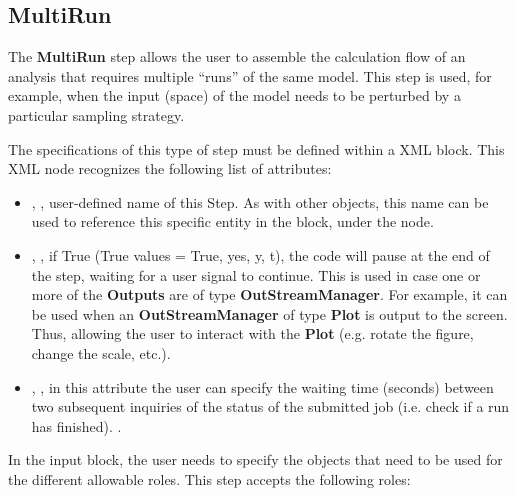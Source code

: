 \subsection{MultiRun}
\label{subsec:stepMultiRun}
The \textbf{MultiRun} step allows the user to assemble the calculation flow of
an analysis that requires multiple ``runs'' of the same model.
%
This step is used, for example, when the input (space) of the model needs to be
perturbed by a particular sampling strategy.
%

The specifications of this type of step must be defined within a
 XML block.
%
This XML node recognizes the following list of attributes:
\vspace{-5mm}
\begin{itemize}
\itemsep0em
\item {}, , user-defined name of
this Step. 
\nb As with other objects, this name can be used to reference this specific
entity in the  block, under the  node.
\item {}, , if True
(True values = True, yes, y, t), the code will pause at the end of
the step, waiting for a user signal to continue. This is used in case one or
more of the \textbf{Outputs} are of type \textbf{OutStreamManager}.
For example, it can be used when an \textbf{OutStreamManager} of type
\textbf{Plot} is output to the screen. Thus, allowing the user to interact with
the \textbf{Plot} (e.g. rotate the figure, change the scale, etc.).
\item {}, , in this attribute
the user can specify the waiting time (seconds) between two subsequent inquiries
of the status of the submitted job (i.e. check if a run has finished).
.
\end{itemize}
\vspace{-5mm}
In the  input block, the user needs to specify the objects
that need to be used for the different allowable roles.
%
This step accepts the following roles:
\vspace{-5mm}
